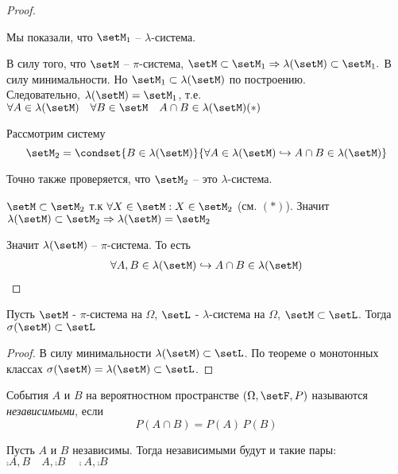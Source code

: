 \begin{proof}
\begin{enumerate}
	\end{enumerate}
			Мы показали, что $\setM_1$ -- $\lambda$-система.

			В силу того, что $\setM$ -- $\pi$-система, $\setM \subset \setM_1 
			\Rightarrow \lambda(\setM) \subset \setM_1.$ 
			В силу минимальности. Но $\setM_1 \subset \lambda(\setM)$ по построению. \\
			Следовательно, $\lambda(\setM) = \setM_1$, т.е. 
			$\forall A \in \lambda(\setM) \quad \forall B \in \setM \quad A \cap B \in \lambda(\setM) (*)$
			
			Рассмотрим систему
			\begin{equation*}
				\setM_2 = \condset{B \in \lambda(\setM)}
					{\forall A \in \lambda(\setM) \hookrightarrow A \cap B \in \lambda(\setM)}
			\end{equation*}

			Точно также проверяется, что $\setM_2$ -- это $\lambda$-система.

			$\setM \subset \setM_2$ т.к $\forall X \in \setM: X \in \setM_2$  (см. $(*)$).
			Значит $\lambda(\setM) \subset \setM_2 \Rightarrow \lambda(\setM) = \setM_2$
			
			Значит $\lambda(\setM)$ -- $\pi$-система. То есть 
			\begin{align*}
				\forall A, B \in \lambda(\setM) \hookrightarrow A \cap B \in \lambda(\setM)
			\end{align*}
\end{proof}

\begin{corollary}
	Пусть $\setM$ - $\pi$-система на $\Omega$, $\setL$ - $\lambda$-система на $\Omega$, $\setM \subset \setL$. Тогда $\sigma(\setM) \subset \setL$
\end{corollary}
\begin{proof}
	В силу минимальности $\lambda(\setM) \subset \setL$.
	По теореме о монотонных классах $\sigma(\setM) = \lambda(\setM) \subset \setL$.
\end{proof}


\begin{definition}
	События $A$ и $B$ на вероятностном пространстве $(\Omega, \setF, P)$ 
	называются \emph{независимыми}, если
	\begin{equation*}
		P(A \cap B) = P(A) \, P(B)
	\end{equation*}
\end{definition}

\begin{exercise}
	Пусть $A$ и $B$ независимы. Тогда независимыми будут и такие пары:\\
	$\comp{A}, B \quad A, \comp{B} \quad \comp{A}, \comp{B}$
\end{exercise}
 

